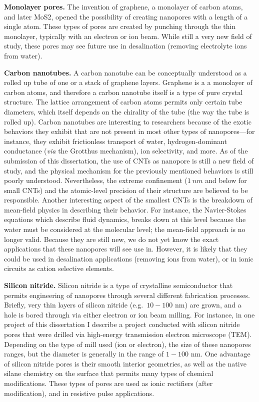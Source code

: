 			\textbf{Monolayer pores.} The invention of graphene, a monolayer of carbon atoms, and later MoS2, opened the possibility of creating nanopores with a length of a single atom. These types of pores are created by punching through the thin monolayer, typically with an electron or ion beam. While still a very new field of study, these pores may see future use in desalination (removing electrolyte ions from water).

			\textbf{Carbon nanotubes.} A carbon nanotube can be conceptually understood as a rolled up tube of one or a stack of graphene layers. Graphene is a a monolayer of carbon atoms, and therefore a carbon nanotube itself is a type of pure crystal structure. The lattice arrangement of carbon atoms permits only certain tube diameters, which itself depends on the chirality of the tube (the way the tube is rolled up). Carbon nanotubes are interesting to researchers because of the exotic behaviors they exhibit that are not present in most other types of nanopores---for instance, they exhibit frictionless transport of water, hydrogen-dominant conductance (\textit{via} the Grotthus mechanism), ion selectivity, and more. As of the submission of this dissertation, the use of CNTs as nanopore is still a new field of study, and the physical mechanism for the previously mentioned behaviors is still poorly understood. Nevertheless, the extreme confinement ($\SI{1}{nm}$ and below for small CNTs) and the atomic-level precision of their structure are believed to be responsible. Another interesting aspect of the smallest CNTs is the breakdown of mean-field physics in describing their behavior. For instance, the Navier-Stokes equations which describe fluid dynamics, breaks down at this level because the water must be considered at the molecular level; the mean-field approach is no longer valid. Because they are still new, we do not yet know the exact applications that these nanopores will see use in. However, it is likely that they could be used in desalination applications (removing ions from water), or in ionic circuits as cation selective elements.

			\textbf{Silicon nitride.} Silicon nitride is a type of crystalline semiconductor that permits engineering of nanopores through several different fabrication processes. Briefly, very thin layers of silicon nitride (e.g.~$10-100$ nm) are grown, and a hole is bored through via either electron or ion beam milling. For instance, in one project of this dissertation I describe a project conducted with silicon nitride pores that were drilled via high-energy transmission electron microscope (TEM). Depending on the type of mill used (ion or electron), the size of these nanopores ranges, but the diameter is generally in the range of $1-100$ nm. One advantage of silicon nitride pores is their smooth interior geometries, as well as the native silane chemistry on the surface that permits many types of chemical modifications. These types of pores are used as ionic rectifiers (after modification), and in resistive pulse applications.

